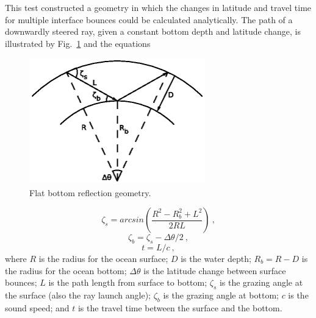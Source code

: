 \documentclass{ws-jca}
\begin{document}
This test constructed a geometry in which the changes in latitude and travel
time for multiple interface bounces could be calculated analytically. The
path of a downwardly steered ray, given a constant bottom depth and
latitude change, is illustrated by Fig.~\ref{fig:reflect_flat_geo} and the equations
\begin{figure}[th]
	\centerline{\includegraphics[width=3in]{ReflectFlat.eps}} 
	\vspace*{8pt}
	\caption{Flat bottom reflection geometry.  
	\label{fig:reflect_flat_geo}}
\end{figure}
\begin{equation}
	\zeta_s = arcsin \left( \frac{ R^2 - R_b^2 + L^2 }{ 2 R L } \right) \:,
	\label{eq:reflection_flat_sgrazing}
\end{equation}
\begin{equation}
	\zeta_b  = \zeta_s - \Delta\theta / 2 \:,
	\label{eq:reflection_flat_bgrazing}
\end{equation}
\begin{equation}
	t = L / c \:,
	\label{eq:reflection_flat_grazing}
\end{equation}
where
$R$ is the radius for the ocean surface;
$D$ is the water depth;
\( R_b = R - D \) is the radius for the ocean bottom;
\( \Delta\theta \) is the latitude change between surface bounces;
$L$ is the path length from surface to bottom;
\( \zeta_s \) is the grazing angle at the surface (also the ray launch angle);
\( \zeta_b  \) is the grazing angle at bottom;
$c$ is the sound speed; and
$t$ is the travel time between the surface and the bottom.
\end{document}

